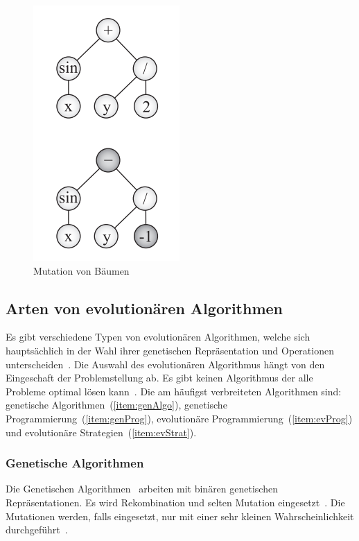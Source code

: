         \begin{figure}[H]
            \includegraphics[scale=0.8, center]{graphics/mutation_tree}
            \caption[\protect{}, S.29]{Mutation von Bäumen\label{fig:mutation_tree}}
        \end{figure}

    \subsection{Arten von evolutionären Algorithmen\label{sub:artenEvAlgos}}

      Es gibt verschiedene Typen von evolutionären Algorithmen, welche sich hauptsächlich in der Wahl ihrer
      genetischen Repräsentation und Operationen unterscheiden~\cite{book:introEvComp}.
      Die Auswahl des evolutionären Algorithmus hängt von den Eingeschaft der Problemstellung ab.
      Es gibt keinen Algorithmus der alle Probleme optimal lösen kann~\cite{book:genAlgoDataStructsEvProg}.
      Die am häufigst verbreiteten Algorithmen sind: genetische Algorithmen~(\vref{item:genAlgo}),
      genetische Programmierung~(\vref{item:genProg}), evolutionäre Programmierung~(\vref{item:evProg})
      und evolutionäre Strategien~(\vref{item:evStrat}).

      \subsubsection{Genetische Algorithmen\label{item:genAlgo}}

        Die Genetischen Algorithmen~\cite{book:adapNaturalArtSys} arbeiten mit binären genetischen Repräsentationen.
        Es wird Rekombination und selten Mutation eingesetzt~\cite[S.128]{book:evAlgo}.
        Die Mutationen werden, falls eingesetzt,
        nur mit einer sehr kleinen Wahrscheinlichkeit durchgeführt~\cite[S.128]{book:evAlgo}.

